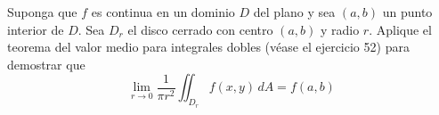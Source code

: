 \item Suponga que $f$ es continua en un dominio $D$ del plano y sea $(a, b)$ un punto interior de $D$. Sea $D_r$ el disco cerrado con centro $(a, b)$ y radio $r$. Aplique el teorema del valor medio para integrales dobles (véase el ejercicio 52) para demostrar que
\[ \lim_{r \to 0} \frac{1}{\pi r^2} \iint_{D_r} f(x, y) \, dA = f(a, b) \]
